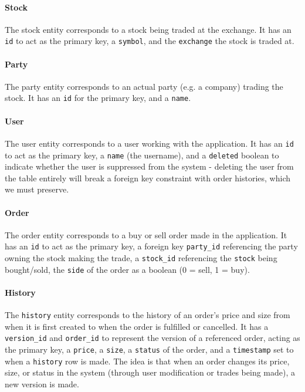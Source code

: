 \documentclass{article}
\begin{document}
\paragraph{Stock} The stock entity corresponds to a stock being traded at the exchange. It has an \texttt{id} to act as the primary key, a \texttt{symbol}, and the \texttt{exchange} the stock is traded at.

\paragraph{Party} The party entity corresponds to an actual party (e.g. a company) trading the stock. It has an \texttt{id} for the primary key, and a \texttt{name}.

\paragraph{User} The user entity corresponds to a user working with the application. It has an \texttt{id} to act as the primary key, a \texttt{name} (the username), and a \texttt{deleted} boolean to indicate whether the user is suppressed from the system - deleting the user from the table entirely will break a foreign key constraint with order histories, which we must preserve.

\paragraph{Order} The order entity corresponds to a buy or sell order made in the application. It has an \texttt{id} to act as the primary key, a foreign key \texttt{party\_id} referencing the party owning the stock making the trade, a \texttt{stock\_id} referencing the \texttt{stock} being bought/sold, the \texttt{side} of the order as a boolean (0 = sell, 1 = buy).

\paragraph{History} The \texttt{history} entity corresponds to the history of an order's price and size from when it is first created to when the order is fulfilled or cancelled. It has a \texttt{version\_id} and \texttt{order\_id} to represent the version of a referenced order, acting as the primary key, a \texttt{price}, a \texttt{size}, a \texttt{status} of the order, and a \texttt{timestamp} set to when a \texttt{history} row is made. The idea is that when an order changes its price,  size, or status in the  system  (through user modification or trades being made), a new version is made.
\end{document}
